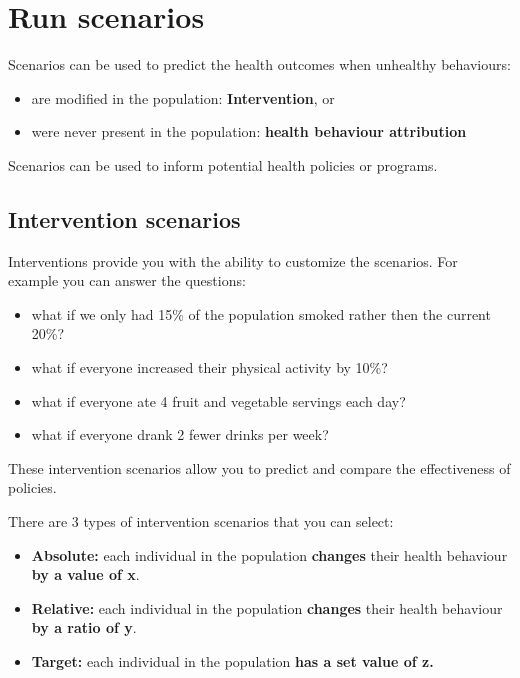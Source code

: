 \documentclass[]{book}
\providecommand{\tightlist}{%
  \setlength{\itemsep}{0pt}\setlength{\parskip}{0pt}}
\begin{document}
\section{Run scenarios}\label{run-scenarios}

Scenarios can be used to predict the health outcomes when unhealthy
behaviours:

\begin{itemize}
\tightlist
\item
  are modified in the population: \textbf{Intervention}, or
\item
  were never present in the population: \textbf{health behaviour
  attribution}
\end{itemize}

Scenarios can be used to inform potential health policies or programs.

\subsection{Intervention scenarios}\label{intervention-scenarios}

Interventions provide you with the ability to customize the scenarios.
For example you can answer the questions:

\begin{itemize}
\tightlist
\item
  what if we only had 15\% of the population smoked rather then the
  current 20\%?
\item
  what if everyone increased their physical activity by 10\%?
\item
  what if everyone ate 4 fruit and vegetable servings each day?
\item
  what if everyone drank 2 fewer drinks per week?
\end{itemize}

These intervention scenarios allow you to predict and compare the
effectiveness of policies.

There are 3 types of intervention scenarios that you can select:

\begin{itemize}
\tightlist
\item
  \textbf{Absolute:} each individual in the population \textbf{changes}
  their health behaviour \textbf{by a value of x}.
\item
  \textbf{Relative:} each individual in the population \textbf{changes}
  their health behaviour \textbf{by a ratio of y}.
\item
  \textbf{Target:} each individual in the population \textbf{has a set
  value of z.}
\end{itemize}
\end{document}
